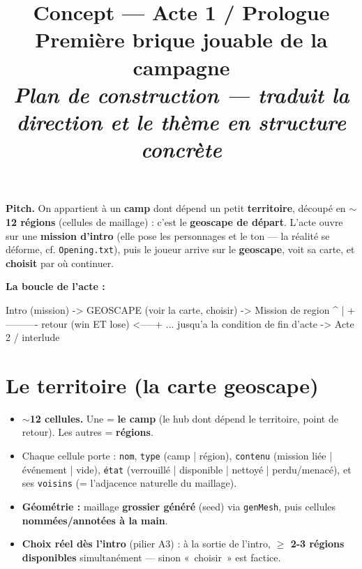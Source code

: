 \documentclass[11pt,a4paper]{article}
\title{\vspace{-1.5em}\textbf{\color{ink}\Huge Concept --- Acte 1 / Prologue}\\[0.3em]
\large\color{accent}Première brique jouable de la campagne\\[0.2em]
\normalsize\color{ink}\itshape Plan de construction --- traduit la direction et le thème en structure concrète}
\author{}
\date{}
\begin{document}
\maketitle
\vspace{-3em}

\begin{pitch}
\textbf{\color{ink}Pitch.} On appartient à un \textbf{camp} dont dépend un petit \textbf{territoire}, découpé en \textbf{${\sim}$12 régions} (cellules de maillage) : c'est le \textbf{geoscape de départ}. L'acte ouvre sur une \textbf{mission d'intro} (elle pose les personnages et le ton --- la réalité se déforme, cf. \texttt{Opening.txt}), puis le joueur arrive sur le \textbf{geoscape}, voit sa carte, et \textbf{choisit} par où continuer.
\end{pitch}

\noindent\textbf{La boucle de l'acte :}
\begin{code}
Intro (mission) -> GEOSCAPE (voir la carte, choisir) -> Mission de region
                       ^                                      |
                       +---------- retour (win ET lose) <-----+
   ... jusqu'a la condition de fin d'acte  ->  Acte 2 / interlude
\end{code}

\section{Le territoire (la carte geoscape)}
\begin{itemize}
\item \textbf{${\sim}$12 cellules.} Une = \textbf{le camp} (le hub dont dépend le territoire, point de retour). Les autres = \textbf{régions}.
\item Chaque cellule porte : \texttt{nom}, \texttt{type} (camp | région), \texttt{contenu} (mission liée | événement | vide), \texttt{état} (verrouillé | disponible | nettoyé | perdu/menacé), et ses \texttt{voisins} (= l'adjacence naturelle du maillage).
\item \textbf{Géométrie :} maillage \textbf{grossier généré} (seed) via \texttt{genMesh}, puis cellules \textbf{nommées/annotées à la main}.
\item \textbf{Choix réel dès l'intro} (pilier A3) : à la sortie de l'intro, \textbf{$\geq$ 2-3 régions disponibles} simultanément --- sinon «~choisir~» est factice.
\end{itemize}
\end{document}
